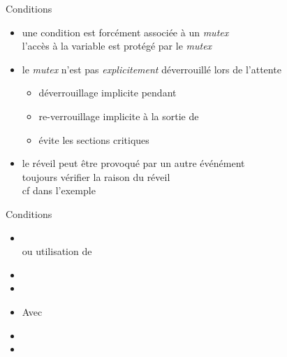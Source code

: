 \begin {frame} {Conditions}
    \begin {itemize}
	\item une condition est forcément associée à un \emph {mutex} \\
	    \implique l'accès à la variable est protégé par le \emph {mutex}

	\item le \emph {mutex} n'est pas \textit {explicitement}
	    déverrouillé lors de l'attente

	    \begin {itemize}
		\item déverrouillage implicite pendant
		\item re-verrouillage implicite à la sortie de
		\item \implique évite les sections critiques

	    \end {itemize}

	\item le réveil peut être provoqué par un autre événément \\
	    \implique toujours vérifier la raison du réveil \\
	    \implique cf  dans l'exemple

    \end {itemize}
\end {frame}

\begin {frame} {Conditions}
    \begin {itemize}
	\item {}
	    \\
	    ou utilisation de 
	\item {}
	\item {}
	\item {}

	    Avec 
	\item {}
	\item {}
    \end {itemize}
\end {frame}


